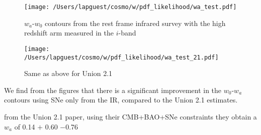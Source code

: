 \documentclass{article}
\begin{document}
\begin{figure}
\texttt{[image: /Users/lapguest/cosmo/w/pdf\_likelihood/wa\_test.pdf]}
\caption{$w_a$-$w_0$ contours from the rest frame infrared survey with the high redshift arm measured in the $i$-band}
\end{figure}

\begin{figure}
\texttt{[image: /Users/lapguest/cosmo/w/pdf\_likelihood/wa\_test\_21.pdf]}
\caption{Same as above for Union 2.1}
\end{figure}

We find from the figures that there is a significant improvement in the $w_0$-$w_a$ contours using SNe only from the IR, compared to the Union 2.1 estimates. 

from the Union 2.1 paper, using their CMB+BAO+SNe constraints they obtain a $w_a$ of 0.14 $+$ 0.60 $-$0.76
\end{document}
